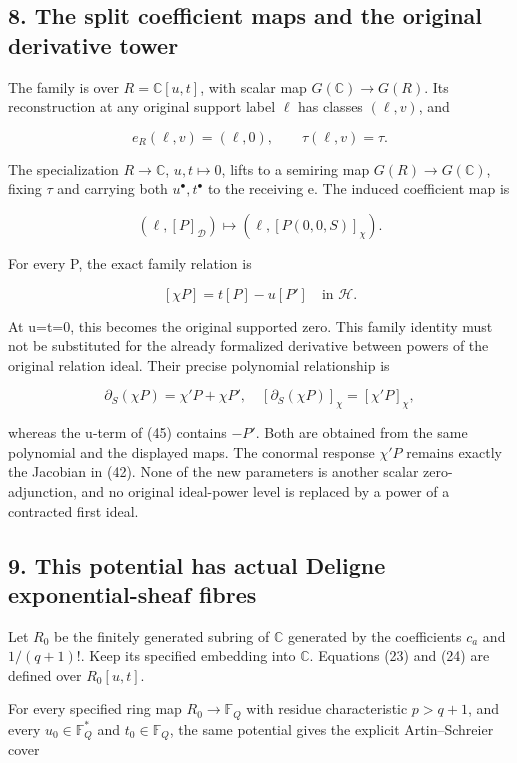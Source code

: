 \documentclass[
  11pt,
]{article}
\begin{document}
\subsection{8. The split coefficient maps and the original derivative
tower}\label{the-split-coefficient-maps-and-the-original-derivative-tower}

The family is over \(R=\mathbb C[u,t]\), with scalar map
\(G(\mathbb C)\to G(R)\). Its reconstruction at any original support
label \(\ell\) has classes \((\ell,v)\), and

\[
e_R(\ell,v)=(\ell,0),\qquad \tau(\ell,v)=\tau.
\tag{43}
\]

The specialization \(R\to\mathbb C\), \(u,t\mapsto0\), lifts to a
semiring map \(G(R)\to G(\mathbb C)\), fixing \(\tau\) and carrying both
\(u^\bullet,t^\bullet\) to the receiving e. The induced coefficient map
is

\[
(\ell,[P]_{\mathcal D})\longmapsto
(\ell,[P(0,0,S)]_\chi).
\tag{44}
\]

For every P, the exact family relation is

\[
[\chi P]=t[P]-u[P']\quad\text{in }\mathcal H.
\tag{45}
\]

At u=t=0, this becomes the original supported zero. This family identity
must not be substituted for the already formalized derivative between
powers of the original relation ideal. Their precise polynomial
relationship is

\[
\partial_S(\chi P)=\chi'P+\chi P',\quad
[\partial_S(\chi P)]_\chi=[\chi'P]_\chi,
\tag{46}
\]

whereas the u-term of (45) contains \(-P'\). Both are obtained from the
same polynomial and the displayed maps. The conormal response \(\chi'P\)
remains exactly the Jacobian in (42). None of the new parameters is
another scalar zero-adjunction, and no original ideal-power level is
replaced by a power of a contracted first ideal.

\subsection{9. This potential has actual Deligne exponential-sheaf
fibres}\label{this-potential-has-actual-deligne-exponential-sheaf-fibres}

Let \(R_0\) be the finitely generated subring of \(\mathbb C\) generated
by the coefficients \(c_a\) and \(1/(q+1)!\). Keep its specified
embedding into \(\mathbb C\). Equations (23) and (24) are defined over
\(R_0[u,t]\).

For every specified ring map \(R_0\to\mathbb F_Q\) with residue
characteristic \(p>q+1\), and every \(u_0\in\mathbb F_Q^*\) and
\(t_0\in\mathbb F_Q\), the same potential gives the explicit
Artin--Schreier cover
\end{document}
